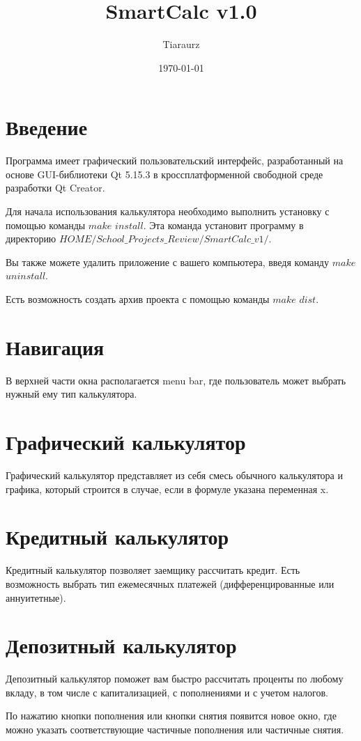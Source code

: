\documentclass[a4paper,12pt]{article}
\author{Tiaraurz}
\title{SmartCalc v1.0}
\date{\today}
\begin{document}
	
\maketitle
\clearpage

\section{Введение}
Программа имеет графический пользовательский интерфейс, разработанный на основе GUI-библиотеки Qt 5.15.3 в кроссплатформенной свободной среде разработки Qt Creator.

Для начала использования калькулятора необходимо выполнить установку с помощью команды $make$ $install$. Эта команда установит программу в директорию $HOME/School\_Projects\_Review/SmartCalc\_v1/$.

Вы также можете удалить приложение с вашего компьютера, введя команду $make$ $uninstall$.

Есть возможность создать архив проекта с помощью команды $make$ $dist$.

\section{Навигация}
В верхней части окна располагается menu bar, где пользователь может выбрать нужный ему тип калькулятора.
\section{Графический калькулятор}
Графический калькулятор представляет из себя смесь обычного калькулятора и графика, который строится в случае, если в формуле указана переменная x.
\section{Кредитный калькулятор}
Кредитный калькулятор позволяет заемщику рассчитать кредит. Есть возможность выбрать тип ежемесячных платежей (дифференцированные или аннуитетные).
\section{Депозитный калькулятор}
Депозитный калькулятор поможет вам быстро рассчитать проценты по любому вкладу, в том числе с капитализацией, с пополнениями и с учетом налогов.

По нажатию кнопки пополнения или кнопки снятия появится новое окно, где можно указать соответствующие частичные пополнения или частичные снятия.


	
	
\end{document}
